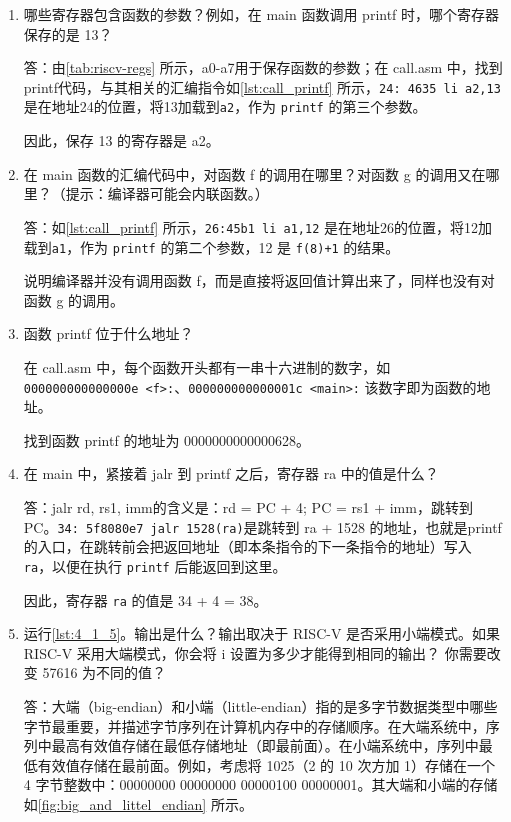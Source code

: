 \begin{enumerate}
	\item 哪些寄存器包含函数的参数？例如，在 main 函数调用 printf 时，哪个寄存器保存的是 13？
	
	答：由\cref{tab:riscv-regs} 所示，a0-a7用于保存函数的参数；在 call.asm 中，找到printf代码，与其相关的汇编指令如\cref{lst:call_printf} 所示，\texttt{24: 4635 li a2,13} 是在地址24的位置，将13加载到\texttt{a2}，作为 \texttt{printf} 的第三个参数。
	
	因此，保存 13 的寄存器是 a2。
	
	\item 在 main 函数的汇编代码中，对函数 f 的调用在哪里？对函数 g 的调用又在哪里？（提示：编译器可能会内联函数。）
	
	答：如\cref{lst:call_printf} 所示，\texttt{26:45b1 li a1,12} 是在地址26的位置，将12加载到\texttt{a1}，作为 \texttt{printf} 的第二个参数，12 是 \texttt{f(8)+1} 的结果。
	
	说明编译器并没有调用函数 f，而是直接将返回值计算出来了，同样也没有对函数 g 的调用。
	
	\item 函数 printf 位于什么地址？
	
	在 call.asm 中，每个函数开头都有一串十六进制的数字，如 \texttt{000000000000000e <f>:}、\texttt{000000000000001c <main>:} 该数字即为函数的地址。
	
	找到函数 printf 的地址为 0000000000000628。
	
	\item 在 main 中，紧接着 jalr 到 printf 之后，寄存器 ra 中的值是什么？
	
	答：jalr rd, rs1, imm的含义是：rd = PC + 4; PC = rs1 + imm，跳转到PC。\texttt{34: 5f8080e7 jalr 1528(ra)}是跳转到 ra + 1528 的地址，也就是printf的入口，在跳转前会把返回地址（即本条指令的下一条指令的地址）写入 \texttt{ra}，以便在执行 \texttt{printf} 后能返回到这里。
	
	因此，寄存器 \texttt{ra} 的值是 34 + 4 = 38。
	
	\item 运行\cref{lst:4_1_5}。输出是什么？输出取决于 RISC-V 是否采用小端模式。如果 RISC-V 采用大端模式，你会将 i 设置为多少才能得到相同的输出？ 你需要改变 57616 为不同的值？
	
	答：大端（big-endian）和小端（little-endian）指的是多字节数据类型中哪些字节最重要，并描述字节序列在计算机内存中的存储顺序。在大端系统中，序列中最高有效值存储在最低存储地址（即最前面）。在小端系统中，序列中最低有效值存储在最前面。例如，考虑将 1025（2 的 10 次方加 1）存储在一个 4 字节整数中：00000000 00000000 00000100 00000001。其大端和小端的存储如\cref{fig:big_and_littel_endian} 所示。
	

\end{enumerate}
